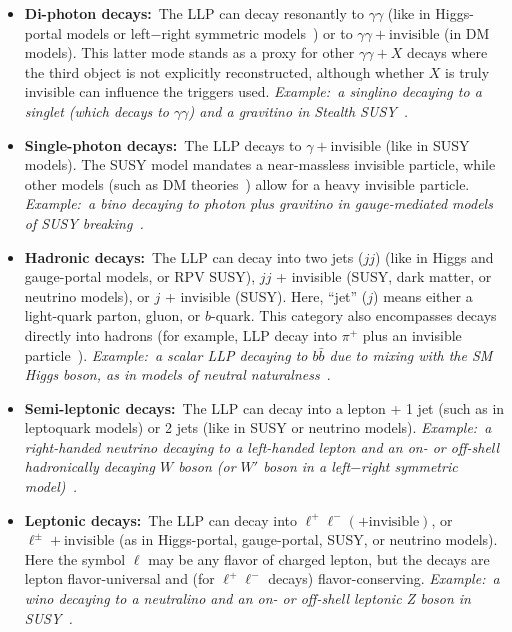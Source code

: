 \begin{itemize}
\item {\bf Di-photon decays:}~The LLP can decay resonantly to $\gamma\gamma$ (like in Higgs-portal models or left$-$right symmetric models~\cite{Dev:2016vle}) or to $\gamma\gamma+\mathrm{invisible}$ (in DM models).
This latter mode stands as a proxy for other $\gamma\gamma+X$ decays where the third object is not explicitly reconstructed, although whether $X$ is truly invisible can influence the triggers used.
\emph{Example:~a singlino decaying to a singlet (which decays to $\gamma\gamma$) and a gravitino in Stealth SUSY~\cite{Fan:2011yu}.}

\item {\bf Single-photon decays:}~The LLP decays to $\gamma+\mathrm{invisible}$ (like in SUSY models).
The SUSY model mandates a near-massless invisible particle, while other models (such as DM theories~\cite{Weiner:2012cb,Primulando:2015lfa}) allow for a heavy invisible particle.
\emph{Example:~a bino decaying to photon plus gravitino in gauge-mediated models of SUSY breaking~\cite{Dimopoulos:1996yq}.}

\item {\bf Hadronic decays:}~The LLP can decay into two jets ($jj$) (like in Higgs and gauge-portal models, or RPV SUSY), $jj$ + invisible (SUSY, dark matter, or neutrino models), or $j$ + invisible (SUSY).
Here, ``jet'' ($j$) means either a light-quark parton, gluon, or $b$-quark.
This category also encompasses decays directly into hadrons (for example, LLP decay into $\pi^+$ plus an invisible particle~\cite{Chen:1995yu,Thomas:1998wy,Feng:1999fu}).
\emph{Example:~a scalar LLP decaying to $b\bar{b}$ due to mixing with the SM Higgs boson, as in models of neutral naturalness~\cite{Chacko:2005pe,Burdman:2006tz,Craig:2015pha}}.

\item {\bf Semi-leptonic decays:}~The LLP can decay into a lepton + 1 jet (such as in leptoquark models) or 2 jets (like in SUSY or neutrino models).
\emph{Example:~a right-handed neutrino decaying to a left-handed lepton and an on- or off-shell hadronically decaying $W$ boson (or $W'$ boson in a left$-$right symmetric model)~\cite{Keung:1983uu}. }

\item {\bf Leptonic decays:}~The LLP can decay into $\ell^+\ell^-(+\mathrm{invisible})$, or $\ell^\pm+\mathrm{invisible}$ (as in Higgs-portal, gauge-portal, SUSY, or neutrino models).
Here the symbol $\ell$ may be any flavor of charged lepton, but the decays are lepton flavor-universal and (for $\ell^+\ell^-$ decays) flavor-conserving.
\emph{Example:~a wino decaying to a neutralino and an on- or off-shell leptonic Z boson in SUSY~\cite{Barbier:2004ez}.}


\end{itemize}
